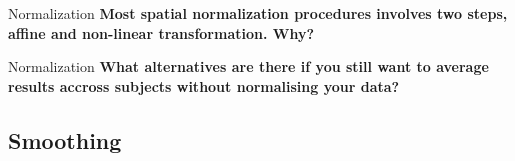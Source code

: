 \documentclass{beamer}
\begin{document}
\begin{frame}{Normalization}
  \textbf{Most spatial normalization procedures involves two steps, affine and non-linear transformation. Why?}

\end{frame}

\begin{frame}{Normalization}
  \textbf{What alternatives are there if you still want to average results accross subjects without normalising your data?}

\end{frame}


\subsection[Smoothing]{Smoothing}
\end{document}
